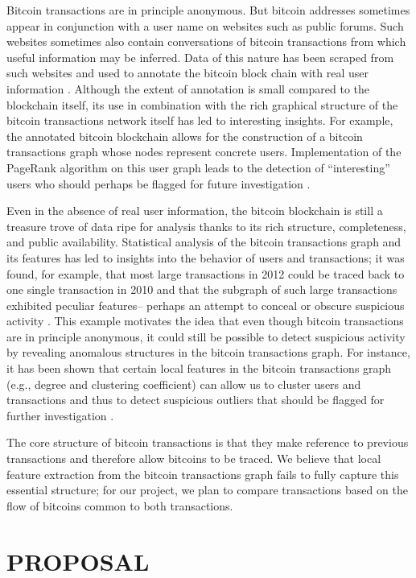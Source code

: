 \documentclass[letterpaper, 10 pt, conference]{ieeeconf}  %
\begin{document}
Bitcoin transactions are in principle anonymous. But bitcoin addresses sometimes appear in conjunction with a user name on websites such as public forums. Such websites sometimes also contain conversations of bitcoin transactions from which useful information may be inferred. Data of this nature has been scraped from such websites and used to annotate the bitcoin block chain with real user information \cite{fleder2015}. Although the extent of annotation is small compared to the blockchain itself, its use in combination with the rich graphical structure of the bitcoin transactions network itself has led to interesting insights. For example, the annotated bitcoin blockchain allows for the construction of a bitcoin transactions graph whose nodes represent concrete users. Implementation of the PageRank algorithm on this user graph leads to the detection of “interesting” users who should perhaps be flagged for future investigation \cite{fleder2015}.

Even in the absence of real user information, the bitcoin blockchain is still a treasure trove of data ripe for analysis thanks to its rich structure, completeness, and public availability. Statistical analysis of the bitcoin transactions graph and its features has led to insights into the behavior of users and transactions; it was found, for example, that most large transactions in 2012 could be traced back to one single transaction in 2010 and that the subgraph of such large transactions exhibited peculiar features-- perhaps an attempt to conceal or obscure suspicious activity \cite{ron2012}. This example motivates the idea that even though bitcoin transactions are in principle anonymous, it could still be possible to detect suspicious activity by revealing anomalous structures in the bitcoin transactions graph. For instance, it has been shown that certain local features in the bitcoin transactions graph (e.g., degree and clustering coefficient) can allow us to cluster users and transactions and thus to detect suspicious outliers that should be flagged for further investigation \cite{pham2016, zambre2013}.

The core structure of bitcoin transactions is that they make reference to previous transactions and therefore allow bitcoins to be traced. We believe that local feature extraction from the bitcoin transactions graph fails to fully capture this essential structure; for our project, we plan to compare transactions based on the flow of bitcoins common to both transactions.

\section{PROPOSAL}
\end{document}
